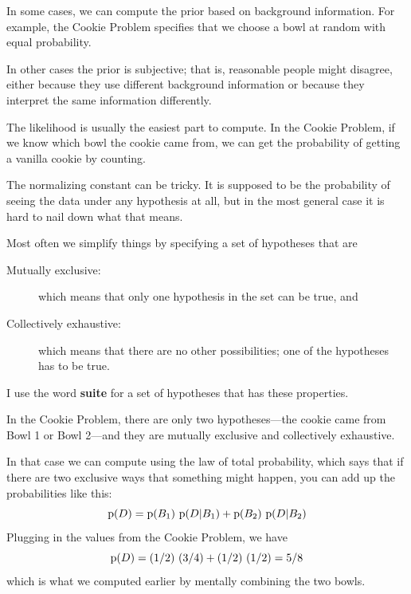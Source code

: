 \documentclass[12pt]{book}
\begin{document}
In some cases, we can compute the prior based on background
information.  For example, the Cookie Problem specifies that we choose
a bowl at random with equal probability.

In other cases the prior is subjective; that is, reasonable people
might disagree, either because they use different background
information or because they interpret the same information
differently.

The likelihood is usually the easiest part to compute.  In the
Cookie Problem, if we know which bowl the cookie came from,
we can get the probability of getting a vanilla cookie by counting.

The normalizing constant can be tricky.  It is supposed to be the
probability of seeing the data under any hypothesis at all, but in the
most general case it is hard to nail down what that means.

Most often we simplify things by specifying a set of hypotheses
that are

\begin{description}

\item[Mutually exclusive:] which means that only one hypothesis in
the set can be true, and

\item[Collectively exhaustive:] which means that there are no other
possibilities; one of the hypotheses has to be true.

\end{description}

I use the word {\bf suite} for a set of hypotheses that has these
properties.

In the Cookie Problem, there are only two hypotheses---the cookie
came from Bowl 1 or Bowl 2---and they are mutually exclusive and
collectively exhaustive.

In that case we can compute  using the law of total probability,
which says that if there are two exclusive ways that something
might happen, you can add up the probabilities like this:
%
\[ \mathrm{p}(D) = \mathrm{p}(B_1)~\mathrm{p}(D|B_1) + \mathrm{p}(B_2)~\mathrm{p}(D|B_2) \]
%
Plugging in the values from the Cookie Problem, we have
%
\[ \mathrm{p}(D) = (1/2)~(3/4) + (1/2)~(1/2) = 5/8 \]
%
which is what we computed earlier by mentally combining the two
bowls.


\newcommand{\MM}{M\&M}
\end{document}
